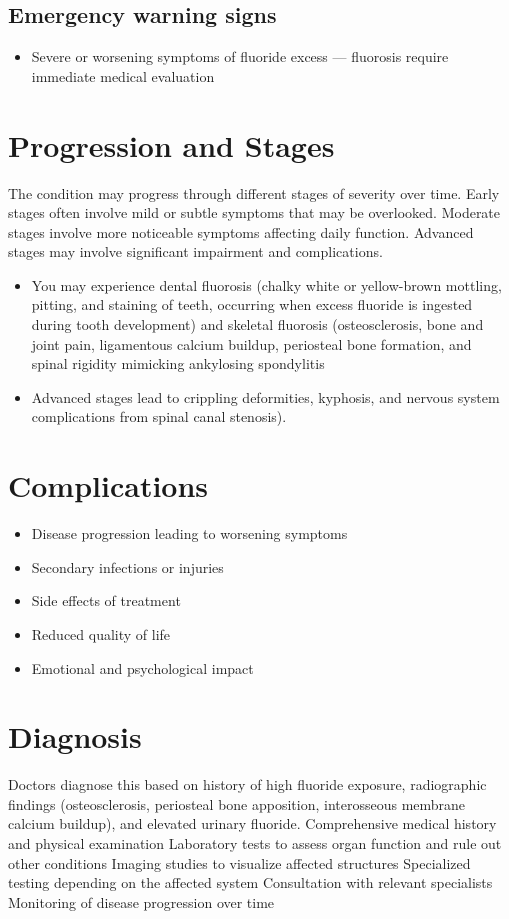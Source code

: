 \subsection{Emergency warning signs}
\begin{itemize}[noitemsep]
  \item Severe or worsening symptoms of fluoride excess --- fluorosis require immediate medical evaluation
\end{itemize}
\section{Progression and Stages}
The condition may progress through different stages of severity over time. Early stages often involve mild or subtle symptoms that may be overlooked. Moderate stages involve more noticeable symptoms affecting daily function. Advanced stages may involve significant impairment and complications.

\begin{itemize}[noitemsep]
  \item You may experience dental fluorosis (chalky white or yellow-brown mottling, pitting, and staining of teeth, occurring when excess fluoride is ingested during tooth development) and skeletal fluorosis (osteosclerosis, bone and joint pain, ligamentous calcium buildup, periosteal bone formation, and spinal rigidity mimicking ankylosing spondylitis
  \item Advanced stages lead to crippling deformities, kyphosis, and nervous system complications from spinal canal stenosis).
\end{itemize}
\section{Complications}
\begin{itemize}[noitemsep]
  \item Disease progression leading to worsening symptoms
  \item Secondary infections or injuries
  \item Side effects of treatment
  \item Reduced quality of life
  \item Emotional and psychological impact
\end{itemize}
\section{Diagnosis}
Doctors diagnose this based on history of high fluoride exposure, radiographic findings (osteosclerosis, periosteal bone apposition, interosseous membrane calcium buildup), and elevated urinary fluoride. Comprehensive medical history and physical examination Laboratory tests to assess organ function and rule out other conditions Imaging studies to visualize affected structures Specialized testing depending on the affected system Consultation with relevant specialists Monitoring of disease progression over time

